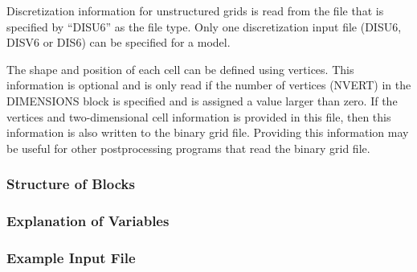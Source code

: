 Discretization information for unstructured grids is read from the file that is specified by ``DISU6'' as the file type.  Only one discretization input file (DISU6, DISV6 or DIS6) can be specified for a model.

The shape and position of each cell can be defined using vertices.  This information is optional and is only read if the number of vertices (NVERT) in the DIMENSIONS block is specified and is assigned a value larger than zero.  If the vertices and two-dimensional cell information is provided in this file, then this information is also written to the binary grid file.  Providing this information may be useful for other postprocessing programs that read the binary grid file.

\vspace{5mm}
\subsubsection{Structure of Blocks}







\vspace{5mm}
\subsubsection{Explanation of Variables}
\begin{description}

\end{description}

\vspace{5mm}
\subsubsection{Example Input File}


